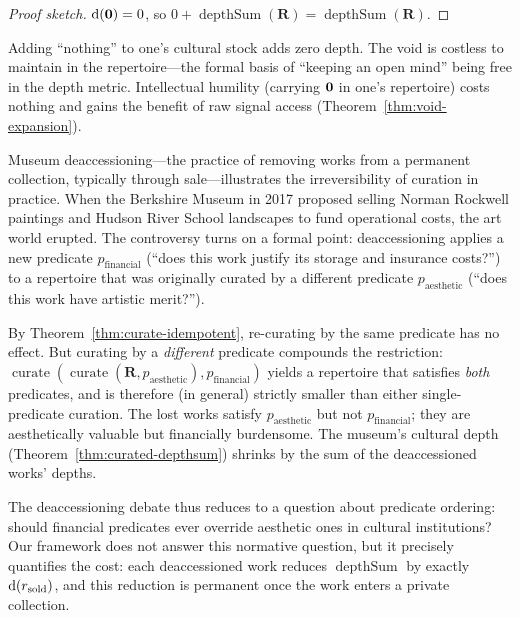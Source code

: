 \begin{proof}[Proof sketch]
$\operatorname{d}(\mathbf{0}) = 0$, so $0 + \operatorname{depthSum}(\mathbf{R}) =
\operatorname{depthSum}(\mathbf{R})$.
\end{proof}

Adding ``nothing'' to one's cultural stock adds zero depth.  The void is
costless to maintain in the repertoire---the formal basis of ``keeping an
open mind'' being free in the depth metric.  Intellectual humility (carrying
$\mathbf{0}$ in one's repertoire) costs nothing and gains the benefit of raw
signal access (Theorem~\ref{thm:void-expansion}).

\begin{example}
\label{ex:deaccessioning}
Museum deaccessioning---the practice of removing works from a permanent
collection, typically through sale---illustrates the irreversibility of
curation in practice.  When the Berkshire Museum in 2017 proposed selling
Norman Rockwell paintings and Hudson River School landscapes to fund
operational costs, the art world erupted.  The controversy turns on a
formal point: deaccessioning applies a new predicate
$p_{\text{financial}}$ (``does this work justify its storage and
insurance costs?'') to a repertoire that was originally curated by a
different predicate $p_{\text{aesthetic}}$ (``does this work have
artistic merit?'').

By Theorem~\ref{thm:curate-idempotent}, re-curating by the same
predicate has no effect.  But curating by a \emph{different} predicate
compounds the restriction:
$\operatorname{curate}(\operatorname{curate}(\mathbf{R},
p_{\text{aesthetic}}), p_{\text{financial}})$ yields a repertoire that
satisfies \emph{both} predicates, and is therefore (in general) strictly
smaller than either single-predicate curation.  The lost works satisfy
$p_{\text{aesthetic}}$ but not $p_{\text{financial}}$; they are
aesthetically valuable but financially burdensome.  The museum's
cultural depth (Theorem~\ref{thm:curated-depthsum}) shrinks by the sum
of the deaccessioned works' depths.

The deaccessioning debate thus reduces to a question about predicate
ordering: should financial predicates ever override aesthetic ones in
cultural institutions?  Our framework does not answer this normative
question, but it precisely quantifies the cost: each deaccessioned work
reduces $\operatorname{depthSum}$ by exactly $\operatorname{d}(r_{\text{sold}})$,
and this reduction is permanent once the work enters a private collection.
\end{example}

